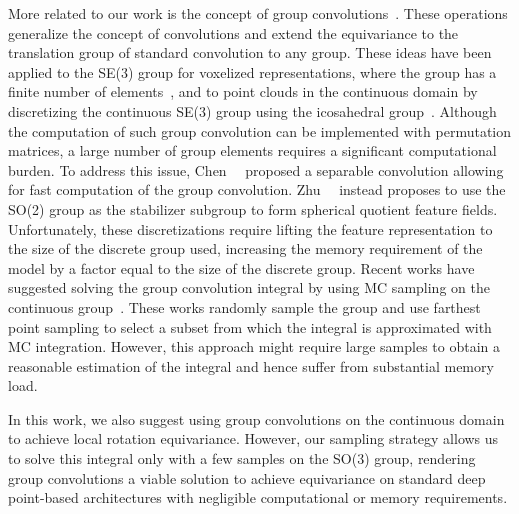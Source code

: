 More related to our work is the concept of group convolutions~\cite{cohen2016group}.
These operations generalize the concept of convolutions and extend the equivariance to the translation group of standard convolution to any group.
These ideas have been applied to the SE(3) group for voxelized representations, where the group has a finite number of elements~\cite{worrall2018cubenet}, and to point clouds in the continuous domain by discretizing the continuous SE(3) group using the icosahedral group~\cite{chen2021equivariant, zhu2023e2pn}.
Although the computation of such group convolution can be implemented with permutation matrices, a large number of group elements requires a significant computational burden.
To address this issue, Chen~\etal~\cite{chen2021equivariant} proposed a separable convolution allowing for fast computation of the group convolution.
Zhu~\etal~\cite{zhu2023e2pn} instead proposes to use the SO(2) group as the stabilizer subgroup to form spherical quotient feature fields.
Unfortunately, these discretizations require lifting the feature representation to the size of the discrete group used, increasing the memory requirement of the model by a factor equal to the size of the discrete group.
Recent works have suggested solving the group convolution integral by using \ac{MC} sampling on the continuous group~\cite{finzi2020generalizing, Hutchinson2021lietransformer}.
These works randomly sample the group and use farthest point sampling to select a subset from which the integral is approximated with \ac{MC} integration.
However, this approach might require large samples to obtain a reasonable estimation of the integral and hence suffer from substantial memory load.

In this work, we also suggest using group convolutions on the continuous domain to achieve local rotation equivariance.
However, our sampling strategy allows us to solve this integral only with a few samples on the SO(3) group, rendering group convolutions a viable solution to achieve equivariance on standard deep point-based architectures with negligible computational or memory requirements.